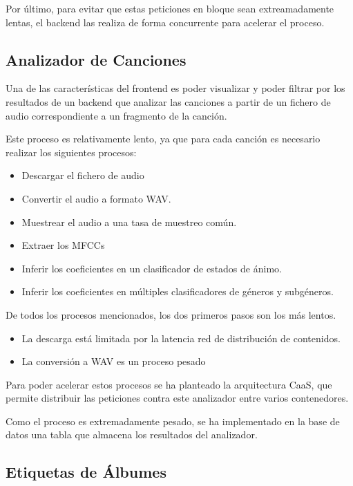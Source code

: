 Por último, para evitar que estas peticiones en bloque sean
extreamadamente lentas, el backend las realiza de forma concurrente para
acelerar el proceso.


\subsection{Analizador de Canciones}\label{analizador-de-canciones}

Una de las características del frontend es poder visualizar y poder
filtrar por los resultados de un backend que analizar las canciones a
partir de un fichero de audio correspondiente a un fragmento de la
canción.

Este proceso es relativamente lento, ya que para cada canción es
necesario realizar los siguientes procesos:

\begin{itemize}
\itemsep0em
\item
  Descargar el fichero de audio
\item
  Convertir el audio a formato WAV.
\item
  Muestrear el audio a una tasa de muestreo común.
\item
  Extraer los MFCCs
\item
  Inferir los coeficientes en un clasificador de estados de ánimo.
\item
  Inferir los coeficientes en múltiples clasificadores de géneros y
  subgéneros.
\end{itemize}

De todos los procesos mencionados, los dos primeros pasos son los más
lentos.

\begin{itemize}
\item
  La descarga está limitada por la latencia red de distribución de
  contenidos.
\item
  La conversión a WAV es un proceso pesado
\end{itemize}

Para poder acelerar estos procesos se ha planteado la arquitectura CaaS, que permite distribuir las peticiones contra
este analizador entre varios contenedores.

Como el proceso es extremadamente pesado, se ha implementado en la base
de datos una tabla que almacena los resultados del analizador.


\subsection{Etiquetas de Álbumes}\label{etiquetas-de-uxe1lbumes}


